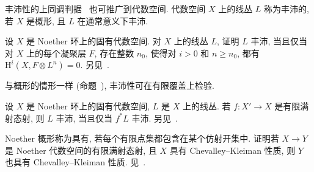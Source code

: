 丰沛性的上同调判据~\cite[命题 $5.3$]{Har77} 也可推广到代数空间. 代数空间 $X$ 上的线丛 $L$ 称为丰沛的, 若 $X$ 是概形, 且 $L$ 在通常意义下丰沛.
\begin{exercise}\label{src:5.5.22}
设 $X$ 是 Noether 环上的固有代数空间. 对 $X$ 上的线丛 $L$, 证明 $L$ 丰沛, 当且仅当对 $X$ 上的每个凝聚层 $F$, 存在整数 $n_0$, 使得对 $i>0$ 和 $n\geq n_0$, 都有 $\mathrm H^i(X,F\otimes L^n)=0$. 另见~\cite[Tag 0D2W]{SP}.
\end{exercise}
与概形的情形一样 (命题~), 丰沛性可在有限覆盖上检验.
\begin{exercise}\label{src:5.5.23}
设 $X$ 是 Noether 环上的固有代数空间, $L$ 是 $X$ 上的线丛. 若 $f:X'\to X$ 是有限满射态射, 则 $L$ 丰沛, 当且仅当 $f^*L$ 丰沛. 另见~\cite[Tag 0GFB]{SP}.
\end{exercise}
\begin{exercise}\label{src:5.5.24}
Noether 概形称为具有, 若每个有限点集都包含在某个仿射开集中. 证明若 $X\to Y$ 是 Noether 代数空间的有限满射态射, 且 $X$ 具有 Chevalley--Kleiman 性质, 则 $Y$ 也具有 Chevalley--Kleiman 性质. 见~\cite[推论 $48$]{Kol12}.
\end{exercise}

